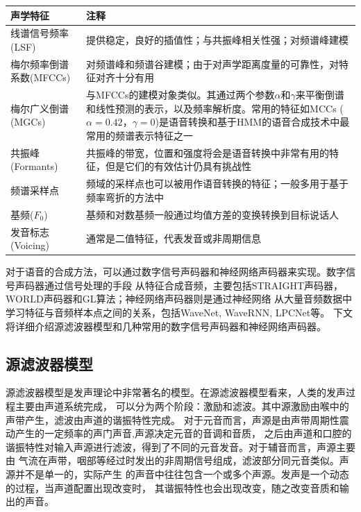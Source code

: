\begin{table}[!hpt]
    \label{tab:vc_feats}
    \centering
    \begin{tabular}{p{}p{}} 
        \toprule
        声学特征 & 注释　\\
        \midrule
        线谱信号频率(LSF) & 提供稳定，良好的插值性；与共振峰相关性强；对频谱峰建模　\\
        梅尔频率倒谱系数(MFCCs) & 对频谱峰和频谱谷建模；由于对声学距离度量的可靠性，对特征对齐十分有用 \\
        梅尔广义倒谱(MGCs) & 与MFCCs的建模对象类似。其通过两个参数$\alpha$和$\gamma$来平衡倒谱和线性预测的表示，以及频率解析度。常用的特征如MCCs ($\alpha=0.42$，$\gamma=0$)是语音转换和基于HMM的语音合成技术中最常用的频谱表示特征之一　\\
        共振峰(Formants) & 共振峰的带宽，位置和强度将会是语音转换中非常有用的特征，但是它们的有效估计仍具有挑战性　\\
        频谱采样点 & 频域的采样点也可以被用作语音转换的特征；一般多用于基于频率弯折的方法中\\
        \midrule
        基频($F_0$) & 基频和对数基频一般通过均值方差的变换转换到目标说话人 \\
        \midrule
        发音标志(Voicing) & 通常是二值特征，代表发音或非周期信息 \\
        \bottomrule
    \end{tabular}
\end{table}

对于语音的合成方法，可以通过数字信号声码器和神经网络声码器来实现。数字信号声码器通过信号处理的手段
从特征合成音频，主要包括STRAIGHT声码器，WORLD声码器和GL算法；神经网络声码器则是通过神经网络
从大量音频数据中学习特征与音频样本点之间的关系，包括WaveNet, WaveRNN, LPCNet等。
下文将详细介绍源滤波器模型和几种常用的数字信号声码器和神经网络声码器。

\subsection{源滤波器模型}
源滤波器模型是发声理论中非常著名的模型。在源滤波器模型看来，人类的发声过程主要由声道系统完成，
可以分为两个阶段：激励和滤波。其中源激励由喉中的声带产生，滤波由声道的谐振特性完成。
对于元音而言，声源是由声带周期性震动产生的一定频率的声门声音,声源决定元音的音调和音质，
之后由声道和口腔的谐振特性对输入声源进行滤波，得到了不同的元音发音。对于辅音而言，声源主要由
气流在声带，咽部等经过时发出的非周期信号组成，滤波部分同元音类似。声源并不是单一的，实际产生
的声音中往往包含一个或多个声源。发声是一个动态的过程，当声道配置出现改变时，
其谐振特性也会出现改变，随之改变音质和输出的声音。

